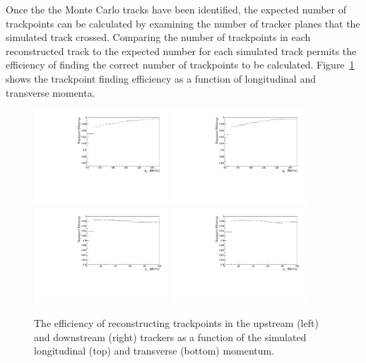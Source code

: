   Once the the Monte Carlo tracks have been identified, the expected number of trackpoints can be calculated by examining the number of tracker planes that the simulated track crossed. Comparing the number of trackpoints in each reconstructed track to the expected number for each simulated track permits the efficiency of finding the correct number of trackpoints to be calculated. Figure~\ref{fig:tp_efficiency} shows the trackpoint finding efficiency as a function of longitudinal and transverse momenta.

  \begin{figure}[p]
    \centering
    \includegraphics[width=0.45\textwidth, angle=0]{08-Performance/upstream_pz_tp_efficiency.pdf}
    \includegraphics[width=0.45\textwidth, angle=0]{08-Performance/downstream_pz_tp_efficiency.pdf}\\
    \includegraphics[width=0.45\textwidth, angle=0]{08-Performance/upstream_pt_tp_efficiency.pdf}
    \includegraphics[width=0.45\textwidth, angle=0]{08-Performance/downstream_pt_tp_efficiency.pdf}
    \caption{\label{fig:tp_efficiency} The efficiency of reconstructing trackpoints in the upstream (left) and downstream (right) trackers as a function of the simulated longitudinal (top) and transverse (bottom) momentum.}
  \end{figure}


